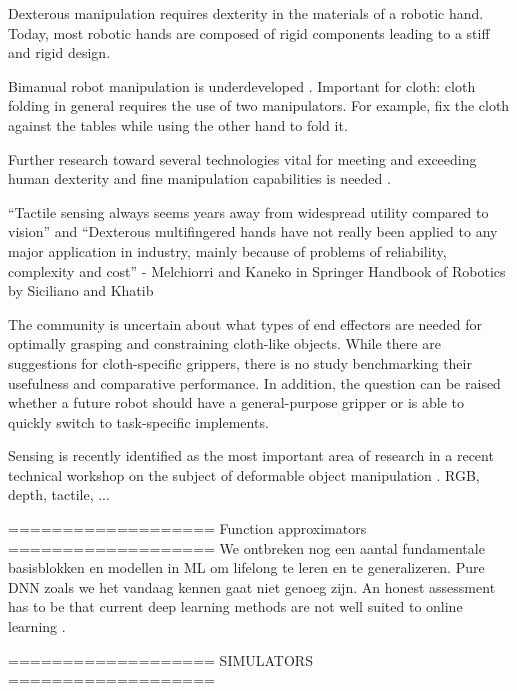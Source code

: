 \documentclass[\home/main.tex]{subfiles}
\begin{document}
Dexterous manipulation requires dexterity in the materials of a robotic hand. Today, most robotic hands are composed of rigid components leading to a stiff and rigid design. %

Bimanual robot manipulation is underdeveloped \autocite{Billard2019}. Important for cloth: cloth folding in general requires the use of two manipulators. For example, fix the cloth against the tables while using the other hand to fold it. 

Further research toward several technologies vital for meeting and exceeding human dexterity and fine manipulation capabilities is needed .

“Tactile sensing always seems years away from widespread utility compared to vision” 
and
“Dexterous multifingered hands have not really been applied to any major application in industry, mainly because of problems of reliability, complexity and cost” 
  - Melchiorri and Kaneko in Springer Handbook of Robotics by Siciliano and Khatib


 The community is uncertain about what types of end effectors are needed for optimally grasping and constraining cloth-like objects. While there are suggestions for cloth-specific grippers, there is no study benchmarking their usefulness and comparative performance. In addition, the question can be raised whether a future robot should have a general-purpose gripper or is able to quickly switch to  task-specific implements.  

 Sensing is recently identified as the most important area of research in a recent technical workshop on the subject of deformable object manipulation \autocite{zhu:hal-02980281}. RGB, depth, tactile, ... 


===================
Function approximators 
===================
We ontbreken nog een aantal fundamentale basisblokken en modellen in ML om lifelong te leren en te generalizeren. Pure DNN zoals we het vandaag kennen gaat niet genoeg zijn.  
An honest assessment has to be that current deep learning methods are not well suited to online learning \autocite{Sutton2018}. %

===================
SIMULATORS 
===================


    
\end{document}
